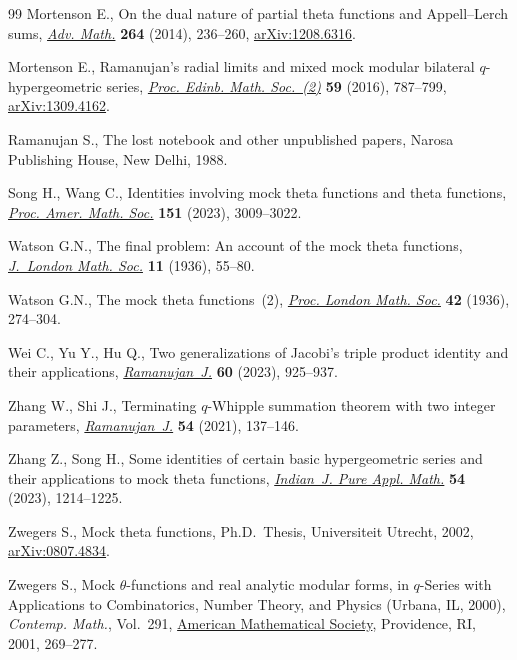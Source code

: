 \documentclass[pdftex]{sigma}
\numberwithin{equation}{section}
\begin{document}
\begin{thebibliography}{99}
Mortenson E., On the dual nature of partial theta functions and
  {A}ppell--{L}erch sums,
  \href{https://doi.org/10.1016/j.aim.2014.07.018}{\textit{Adv. Math.}}
  \textbf{264} (2014), 236--260,
  \href{http://arxiv.org/abs/1208.6316}{arXiv:1208.6316}.

Mortenson E., Ramanujan's radial limits and mixed mock modular bilateral
  {$q$}-hypergeometric series,
  \href{https://doi.org/10.1017/S0013091515000425}{\textit{Proc. Edinb. Math.
  Soc.~(2)}} \textbf{59} (2016), 787--799,
  \href{http://arxiv.org/abs/1309.4162}{arXiv:1309.4162}.

Ramanujan S., The lost notebook and other unpublished papers, Narosa Publishing
  House, New Delhi, 1988.

Song H., Wang C., Identities involving mock theta functions and theta
  functions, \href{https://doi.org/10.1090/proc/16343}{\textit{Proc. Amer.
  Math. Soc.}} \textbf{151} (2023), 3009--3022.

Watson G.N., The final problem: {A}n account of the mock theta functions,
  \href{https://doi.org/10.1112/jlms/s1-11.1.55}{\textit{J.~London Math. Soc.}}
  \textbf{11} (1936), 55--80.

Watson G.N., The mock theta functions~(2),
  \href{https://doi.org/10.1112/plms/s2-42.1.274}{\textit{Proc. London Math.
  Soc.}} \textbf{42} (1936), 274--304.

Wei C., Yu Y., Hu Q., Two generalizations of {J}acobi's triple product identity
  and their applications,
  \href{https://doi.org/10.1007/s11139-022-00640-x}{\textit{Ramanujan~J.}}
  \textbf{60} (2023), 925--937.

Zhang W., Shi J., Terminating {$q$}-{W}hipple summation theorem with two
  integer parameters,
  \href{https://doi.org/10.1007/s11139-019-00208-2}{\textit{Ramanujan~J.}}
  \textbf{54} (2021), 137--146.

Zhang Z., Song H., Some identities of certain basic hypergeometric series and
  their applications to mock theta functions,
  \href{https://doi.org/10.1007/s13226-022-00335-5}{\textit{Indian~J. Pure
  Appl. Math.}} \textbf{54} (2023), 1214--1225.

Zwegers S., Mock theta functions, Ph.D.~Thesis, {U}niversiteit Utrecht, 2002,
  \href{http://arxiv.org/abs/0807.4834}{arXiv:0807.4834}.

Zwegers S., Mock {$\theta$}-functions and real analytic modular forms, in
  {$q$}-{S}eries with {A}pplications to {C}ombinatorics, {N}umber {T}heory, and
  {P}hysics ({U}rbana, {IL}, 2000), \textit{Contemp. Math.}, Vol.~291,
  \href{https://doi.org/10.1090/conm/291/04907}{American Mathematical Society},
  Providence, RI, 2001, 269--277.

\end{thebibliography}\LastPageEnding
\end{document}
